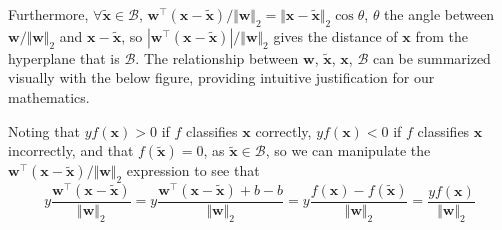 \documentclass{article}
\numberwithin{equation}{section}
\begin{document}
\medskip

Furthermore, $ \forall \tilde{\mathbf{x}} \in \mathcal{B} $,
$ \mathbf{w}^\top(\mathbf{x} - \tilde{\mathbf{x}}) / \Vert\mathbf{w}\Vert_2 =
\Vert\mathbf{x} - \tilde{\mathbf{x}}\Vert_2\cos\theta $, $ \theta $ the angle
between $ \mathbf{w} / \Vert\mathbf{w}\Vert_2 $ and
$ \mathbf{x} - \tilde{\mathbf{x}} $, so $ |\mathbf{w}^\top(\mathbf{x} -
\tilde{\mathbf{x}})| / \Vert\mathbf{w}\Vert_2 $ gives the distance of
$ \mathbf{x} $ from the hyperplane that is $ \mathcal{B} $. The relationship
between $ \mathbf{w} $, $ \tilde{\mathbf{x}} $, $ \mathbf{x} $,
$ \mathcal{B} $ can be summarized visually with the below figure, providing
intuitive justification for our mathematics.
\begin{figure}[h]
    \centering
    \label{fig:3.2.1}
\end{figure}

Noting that $ yf(\mathbf{x}) > 0 $ if $ f $ classifies $ \mathbf{x} $
correctly, $ yf(\mathbf{x}) < 0 $ if $ f $ classifies $ \mathbf{x} $
incorrectly, and that $ f(\tilde{\mathbf{x}}) = 0 $, as
$ \tilde{\mathbf{x}} \in \mathcal{B} $, so we can manipulate the
$ \mathbf{w}^\top(\mathbf{x} - \tilde{\mathbf{x}}) / \Vert\mathbf{w}\Vert_2 $
expression to see that
\begin{equation*}
    y\frac{
        \mathbf{w}^\top(\mathbf{x} - \tilde{\mathbf{x}})
    }{
        \Vert\mathbf{w}\Vert_2
    } =
    y\frac{
        \mathbf{w}^\top(\mathbf{x} - \tilde{\mathbf{x}}) + b - b
    }{
        \Vert\mathbf{w}\Vert_2
    } =
    y\frac{f(\mathbf{x}) - f(\tilde{\mathbf{x}})}{\Vert\mathbf{w}\Vert_2} =
    \frac{yf(\mathbf{x})}{\Vert\mathbf{w}\Vert_2}
\end{equation*}
\end{document}
